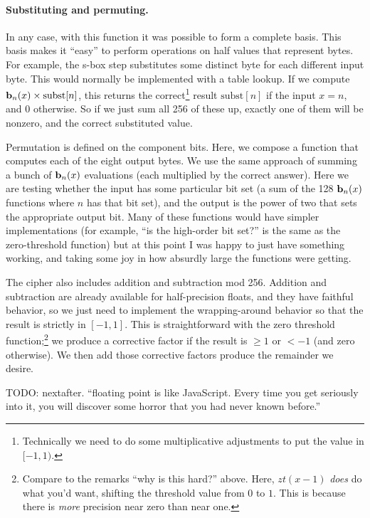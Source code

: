 \documentclass[twocolumn]{article}
\newcommand\basis{\ensuremath{\textrm{\bf b}}}
\begin{document}
\paragraph{Substituting and permuting.}
In any case, with this function it was possible to form a complete basis. This basis
makes it ``easy'' to perform operations on half values that represent bytes. For
example, the s-box step substitutes some distinct byte for each different input
byte. This would normally be implemented with a table lookup. If we compute
$\basis_n(x) \times \mathrm{subst}[n]$, this returns the correct\footnote{Technically
  we need to do some multiplicative adjustments to put the value in $[-1, 1)$.}
result $\mathrm{subst}[n]$ if the input $x = n$, and $0$ otherwise.
So if we just sum all 256 of these up, exactly one of them will be nonzero,
and the correct substituted value.

Permutation is defined on the component bits. Here, we compose a function that
computes each of the eight output bytes. We use the same approach of summing
a bunch of $\basis_n(x)$ evaluations (each multiplied by the correct answer).
Here we are testing whether the input has some particular bit set (a sum of the
128 $\basis_n(x)$ functions where $n$ has that bit set), and the output is the
power of two that sets the appropriate output bit. Many of these functions would
have simpler implementations (for example, ``is the high-order bit set?'' is the
same as the zero-threshold function) but at this point I was happy to just have
something working, and taking some joy in how absurdly large the functions
were getting.

The cipher also includes addition and subtraction mod 256. Addition
and subtraction are already available for half-precision floats, and
they have faithful behavior, so we just need to implement the wrapping-around
behavior so that the result is strictly in $[-1, 1]$.
This is straightforward with the zero threshold function;\footnote{Compare to
  the remarks ``why is this hard?'' above. Here, $zt(x - 1)$ {\em does} do what you'd want,
  shifting the threshold value from $0$ to $1$. This is because there is {\em more}
  precision near zero than near one.}
we produce a corrective factor if the result is $\geq 1$ or $< -1$ (and zero otherwise).
We then add those corrective factors produce the remainder we desire.

TODO: nextafter. ``floating point is like JavaScript. Every time you get seriously into it, you will discover some horror that you had never known before.''
\end{document}
